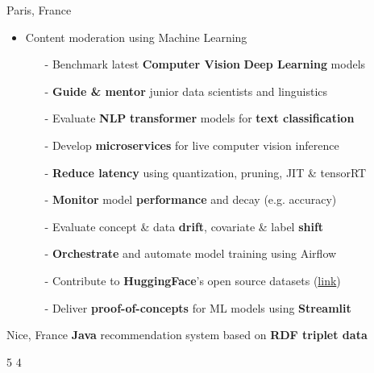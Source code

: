 \documentclass[10pt,a4paper,ragged2e]{altacv}
\begin{document}
\divider

     {Paris, France}
\begin{itemize}
    \item  Content moderation using Machine Learning
    \vspace{0.5em}
    \begin{itemize}
        \item[-] Benchmark latest \textbf{Computer Vision} \textbf{Deep Learning} models
        \item[-] \textbf{Guide \& mentor} junior data scientists and linguistics
        \item[-] Evaluate \textbf{NLP} \textbf{transformer} models for \textbf{text classification}  
        \item[-] Develop \textbf{microservices} for live computer vision inference 
        \item[-] \textbf{Reduce latency} using quantization, pruning, JIT \& tensorRT
        \item[-] \textbf{Monitor} model \textbf{performance} and decay (e.g. accuracy)
        \item[-] Evaluate concept \& data \textbf{drift}, covariate \& label \textbf{shift}
        \item[-] \textbf{Orchestrate} and automate model training using Airflow 
        \item[-] Contribute to \textbf{HuggingFace}'s open source datasets (\href{https://github.com/pulls?q=is%3Apr+author%3Ahfawaz+archived%3Afalse+is%3Aclosed+huggingface+is%3Amerged}{link})
        \item[-] Deliver \textbf{proof-of-concepts} for ML models using \textbf{Streamlit}
    \end{itemize}
\end{itemize}

\divider

     {Nice, France}
\textbf{Java} recommendation system based on \textbf{RDF triplet data}

 {5}
 {4}



\end{document}
